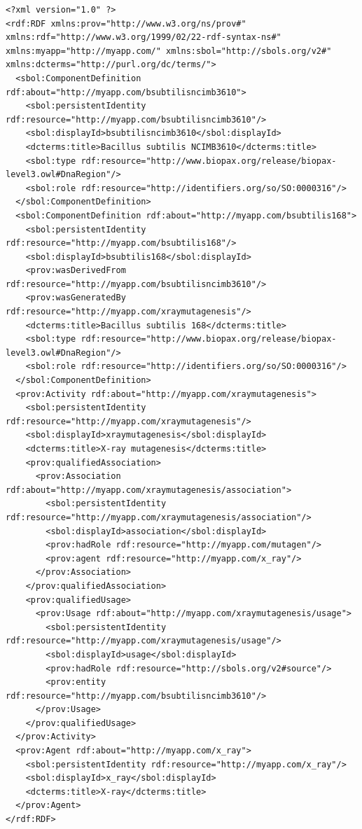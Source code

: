 \begin{lstlisting}
<?xml version="1.0" ?>
<rdf:RDF xmlns:prov="http://www.w3.org/ns/prov#" xmlns:rdf="http://www.w3.org/1999/02/22-rdf-syntax-ns#" xmlns:myapp="http://myapp.com/" xmlns:sbol="http://sbols.org/v2#" xmlns:dcterms="http://purl.org/dc/terms/">
  <sbol:ComponentDefinition rdf:about="http://myapp.com/bsubtilisncimb3610">
    <sbol:persistentIdentity rdf:resource="http://myapp.com/bsubtilisncimb3610"/>
    <sbol:displayId>bsubtilisncimb3610</sbol:displayId>
    <dcterms:title>Bacillus subtilis NCIMB3610</dcterms:title>
    <sbol:type rdf:resource="http://www.biopax.org/release/biopax-level3.owl#DnaRegion"/>
    <sbol:role rdf:resource="http://identifiers.org/so/SO:0000316"/>
  </sbol:ComponentDefinition>
  <sbol:ComponentDefinition rdf:about="http://myapp.com/bsubtilis168">
    <sbol:persistentIdentity rdf:resource="http://myapp.com/bsubtilis168"/>
    <sbol:displayId>bsubtilis168</sbol:displayId>
    <prov:wasDerivedFrom rdf:resource="http://myapp.com/bsubtilisncimb3610"/>
    <prov:wasGeneratedBy rdf:resource="http://myapp.com/xraymutagenesis"/>
    <dcterms:title>Bacillus subtilis 168</dcterms:title>
    <sbol:type rdf:resource="http://www.biopax.org/release/biopax-level3.owl#DnaRegion"/>
    <sbol:role rdf:resource="http://identifiers.org/so/SO:0000316"/>
  </sbol:ComponentDefinition>
  <prov:Activity rdf:about="http://myapp.com/xraymutagenesis">
    <sbol:persistentIdentity rdf:resource="http://myapp.com/xraymutagenesis"/>
    <sbol:displayId>xraymutagenesis</sbol:displayId>
    <dcterms:title>X-ray mutagenesis</dcterms:title>
    <prov:qualifiedAssociation>
      <prov:Association rdf:about="http://myapp.com/xraymutagenesis/association">
        <sbol:persistentIdentity rdf:resource="http://myapp.com/xraymutagenesis/association"/>
        <sbol:displayId>association</sbol:displayId>
        <prov:hadRole rdf:resource="http://myapp.com/mutagen"/>
        <prov:agent rdf:resource="http://myapp.com/x_ray"/>
      </prov:Association>
    </prov:qualifiedAssociation>
    <prov:qualifiedUsage>
      <prov:Usage rdf:about="http://myapp.com/xraymutagenesis/usage">
        <sbol:persistentIdentity rdf:resource="http://myapp.com/xraymutagenesis/usage"/>
        <sbol:displayId>usage</sbol:displayId>
        <prov:hadRole rdf:resource="http://sbols.org/v2#source"/>
        <prov:entity rdf:resource="http://myapp.com/bsubtilisncimb3610"/>
      </prov:Usage>
    </prov:qualifiedUsage>
  </prov:Activity>
  <prov:Agent rdf:about="http://myapp.com/x_ray">
    <sbol:persistentIdentity rdf:resource="http://myapp.com/x_ray"/>
    <sbol:displayId>x_ray</sbol:displayId>
    <dcterms:title>X-ray</dcterms:title>
  </prov:Agent>
</rdf:RDF>
\end{lstlisting}

